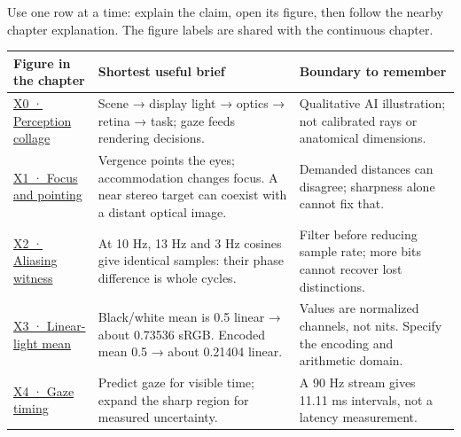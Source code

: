 Use one row at a time: explain the claim, open its figure, then follow the nearby chapter explanation. The figure labels are shared with the continuous chapter.

{\def\LTcaptype{none} %
\begin{longtable}[]{@{}
  >{\raggedright\arraybackslash}p{}
  >{\raggedright\arraybackslash}p{}
  >{\raggedright\arraybackslash}p{}@{}}
\toprule\noalign{}
\begin{minipage}[b]{\linewidth}\raggedright
Figure in the chapter
\end{minipage} & \begin{minipage}[b]{\linewidth}\raggedright
Shortest useful brief
\end{minipage} & \begin{minipage}[b]{\linewidth}\raggedright
Boundary to remember
\end{minipage} \\
\midrule\noalign{}
\endhead
\bottomrule\noalign{}
\endlastfoot
\hyperref[04-visual-computing-ii-ch042-figure-x0-a-qualitative-picture-of-the-xr-loop]{X0 · Perception collage} & Scene → display light → optics → retina → task; gaze feeds rendering decisions. & Qualitative AI illustration; not calibrated rays or anatomical dimensions. \\
\hyperref[04-visual-computing-ii-ch042-figure-x1-two-simultaneous-depth-demands]{X1 · Focus and pointing} & Vergence points the eyes; accommodation changes focus. A near stereo target can coexist with a distant optical image. & Demanded distances can disagree; sharpness alone cannot fix that. \\
\hyperref[04-visual-computing-ii-ch042-figure-x2-the-samples-cannot-name-their-original]{X2 · Aliasing witness} & At 10 Hz, 13 Hz and 3 Hz cosines give identical samples: their phase difference is whole cycles. & Filter before reducing sample rate; more bits cannot recover lost distinctions. \\
\hyperref[04-visual-computing-ii-ch042-figure-x3-same-endpoints-different-averaging-domain]{X3 · Linear-light mean} & Black/white mean is 0.5 linear → about 0.73536 sRGB. Encoded mean 0.5 → about 0.21404 linear. & Values are normalized channels, not nits. Specify the encoding and arithmetic domain. \\
\hyperref[04-visual-computing-ii-ch042-figure-x4-aim-detail-at-visible-time]{X4 · Gaze timing} & Predict gaze for visible time; expand the sharp region for measured uncertainty. & A 90 Hz stream gives 11.11 ms intervals, not a latency measurement. \\
\end{longtable}
}

